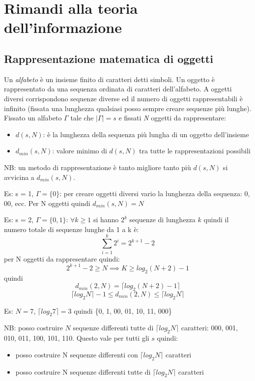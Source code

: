 \section{Rimandi alla teoria dell'informazione}
\subsection{Rappresentazione matematica di oggetti}
Un \emph{alfabeto} è un insieme finito di caratteri detti simboli. Un oggetto è rappresentato da una sequenza ordinata di caratteri dell'alfabeto. A oggetti diversi corrispondono sequenze diverse ed il numero di oggetti rappresentabili è infinito (fissata una lunghezza qualsiasi posso sempre creare sequenze più lunghe). 
Fissato un alfabeto $\Gamma$ tale che $|\Gamma| = s$ e fissati \emph{N} oggetti da rappresentare:
\begin{itemize}
    \item $d(s, N)$: è la lunghezza della sequenza più lungha di un oggetto dell'insieme
    \item $d_{min}(s, N)$: valore minimo di $d(s, N)$ tra tutte le rappresentazioni possibili
\end{itemize}

NB: un metodo di rappresentazione è tanto migliore tanto più $d(s, N)$ si avvicina a $d_{min}(s, N)$.

Es: s = 1, $\Gamma = \{0\}$: per creare oggetti diversi vario la lunghezza della sequenza: 0, 00, ecc. Per N oggetti quindi $d_{min}(s, N) = N$

Es: s = 2, $\Gamma = \{0, 1\}$: $\forall k \geq 1$ si hanno $2^{k}$ sequenze di lunghezza $k$ quindi il numero totale di sequenze lunghe da 1 a k è:
$$
    \sum^{k}_{i=1} 2^{i} = 2^{k+1} - 2
$$
per N oggetti da rappresentare quindi:
$$
    2^{k+1} - 2 \geq N \implies K \geq log_{2}(N+2) - 1
$$
quindi
$$ d_{min}(2, N) = \lceil log_{2}(N+2) - 1 \rceil $$
$$ \lceil log_{2}N \rceil - 1 \leq d_{min}(2, N) \leq \lceil log_{2}N \rceil $$

Es: $N = 7$, $\lceil log_{2}7 \rceil = 3$ quindi \{0, 1, 00, 01, 10, 11, 000\}

NB: posso costruire $N$ sequenze differenti tutte di $ \lceil log_{2}N \rceil $ caratteri: {000, 001, 010, 011, 100, 101, 110}. Questo vale per tutti gli $s$ quindi:
\begin{itemize}
    \item posso costruire N sequenze differenti con $ \lceil log_{2}N \rceil $ caratteri
    \item posso costruire N sequenze differenti tutte di $ \lceil log_{2}N \rceil $ caratteri
\end{itemize}


